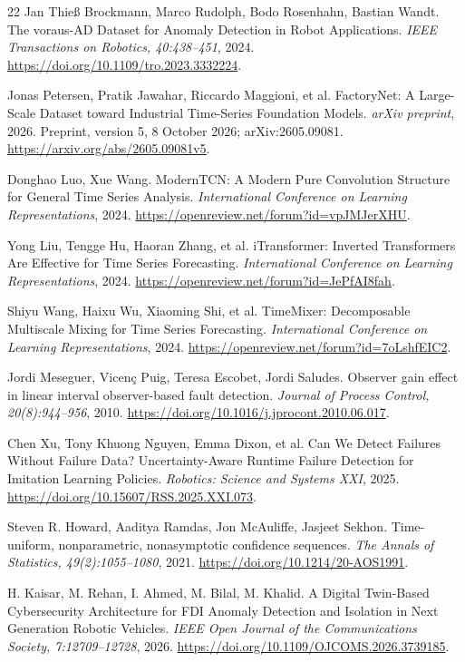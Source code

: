 \begin{thebibliography}{22}
 Jan Thieß Brockmann, Marco Rudolph, Bodo Rosenhahn, Bastian Wandt. {The voraus-AD Dataset for Anomaly Detection in Robot Applications}. \emph{IEEE Transactions on Robotics, 40:438--451}, 2024. \url{https://doi.org/10.1109/tro.2023.3332224}.

 Jonas Petersen, Pratik Jawahar, Riccardo Maggioni, et al. {FactoryNet: A Large-Scale Dataset toward Industrial Time-Series Foundation Models}. \emph{arXiv preprint}, 2026. Preprint, version 5, 8 October 2026; arXiv:2605.09081. \url{https://arxiv.org/abs/2605.09081v5}.

 Donghao Luo, Xue Wang. {ModernTCN: A Modern Pure Convolution Structure for General Time Series Analysis}. \emph{International Conference on Learning Representations}, 2024. \url{https://openreview.net/forum?id=vpJMJerXHU}.

 Yong Liu, Tengge Hu, Haoran Zhang, et al. {iTransformer: Inverted Transformers Are Effective for Time Series Forecasting}. \emph{International Conference on Learning Representations}, 2024. \url{https://openreview.net/forum?id=JePfAI8fah}.

 Shiyu Wang, Haixu Wu, Xiaoming Shi, et al. {TimeMixer: Decomposable Multiscale Mixing for Time Series Forecasting}. \emph{International Conference on Learning Representations}, 2024. \url{https://openreview.net/forum?id=7oLshfEIC2}.

 Jordi Meseguer, Vicen{\c c} Puig, Teresa Escobet, Jordi Saludes. {Observer gain effect in linear interval observer-based fault detection}. \emph{Journal of Process Control, 20(8):944--956}, 2010. \url{https://doi.org/10.1016/j.jprocont.2010.06.017}.

 Chen Xu, Tony Khuong Nguyen, Emma Dixon, et al. {Can We Detect Failures Without Failure Data? Uncertainty-Aware Runtime Failure Detection for Imitation Learning Policies}. \emph{Robotics: Science and Systems XXI}, 2025. \url{https://doi.org/10.15607/RSS.2025.XXI.073}.

 Steven R. Howard, Aaditya Ramdas, Jon McAuliffe, Jasjeet Sekhon. {Time-uniform, nonparametric, nonasymptotic confidence sequences}. \emph{The Annals of Statistics, 49(2):1055--1080}, 2021. \url{https://doi.org/10.1214/20-AOS1991}.

 H. Kaisar, M. Rehan, I. Ahmed, M. Bilal, M. Khalid. {A Digital Twin-Based Cybersecurity Architecture for FDI Anomaly Detection and Isolation in Next Generation Robotic Vehicles}. \emph{IEEE Open Journal of the Communications Society, 7:12709--12728}, 2026. \url{https://doi.org/10.1109/OJCOMS.2026.3739185}.


\end{thebibliography}
